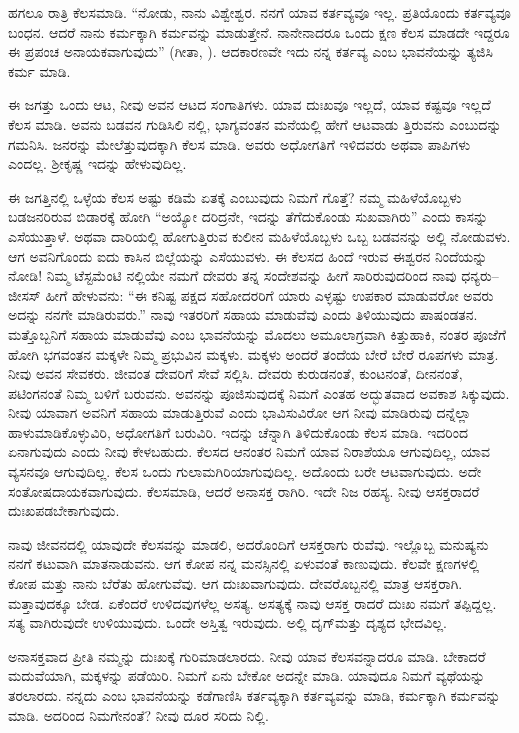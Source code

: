 ಹಗಲೂ ರಾತ್ರಿ ಕೆಲಸಮಾಡಿ. “ನೋಡು, ನಾನು ವಿಶ್ವೇಶ್ವರ. ನನಗೆ ಯಾವ ಕರ್ತವ್ಯವೂ ಇಲ್ಲ. ಪ್ರತಿಯೊಂದು ಕರ್ತವ್ಯವೂ ಬಂಧನ. ಆದರೆ ನಾನು ಕರ್ಮಕ್ಕಾಗಿ ಕರ್ಮವನ್ನು ಮಾಡುತ್ತೇನೆ. ನಾನೇನಾದರೂ ಒಂದು ಕ್ಷಣ ಕೆಲಸ ಮಾಡದೇ ಇದ್ದರೂ ಈ ಪ್ರಪಂಚ ಅನಾಯಕ\-ವಾಗುವುದು” (ಗೀತಾ, ). ಆದಕಾರಣವೇ ಇದು ನನ್ನ ಕರ್ತವ್ಯ ಎಂಬ ಭಾವನೆಯನ್ನು ತ್ಯಜಿಸಿ ಕರ್ಮ ಮಾಡಿ.

ಈ ಜಗತ್ತು ಒಂದು ಆಟ, ನೀವು ಅವನ ಆಟದ ಸಂಗಾತಿಗಳು. ಯಾವ ದುಃಖವೂ ಇಲ್ಲದೆ, ಯಾವ ಕಷ್ಟವೂ ಇಲ್ಲದೆ ಕೆಲಸ ಮಾಡಿ. ಅವನು ಬಡವನ ಗುಡಿಸಿಲಿ ನಲ್ಲಿ, ಭಾಗ್ಯವಂತನ ಮನೆಯಲ್ಲಿ ಹೇಗೆ ಆಟವಾಡು ತ್ತಿರುವನು ಎಂಬುದನ್ನು ಗಮನಿಸಿ. ಜನರನ್ನು ಮೇಲೆತ್ತುವುದಕ್ಕಾಗಿ ಕೆಲಸ ಮಾಡಿ. ಅವರು ಅಧೋಗತಿಗೆ ಇಳಿದವರು ಅಥವಾ ಪಾಪಿಗಳು ಎಂದಲ್ಲ. ಶ‍್ರೀಕೃಷ್ಣ ಇದನ್ನು ಹೇಳುವುದಿಲ್ಲ.

ಈ ಜಗತ್ತಿನಲ್ಲಿ ಒಳ್ಳೆಯ ಕೆಲಸ ಅಷ್ಟು ಕಡಿಮೆ ಏತಕ್ಕೆ ಎಂಬುವುದು ನಿಮಗೆ ಗೊತ್ತೆ? ನಮ್ಮ ಮಹಿಳೆಯೊಬ್ಬಳು ಬಡಜನರಿರುವ ಬಿಡಾರಕ್ಕೆ ಹೋಗಿ “ಅಯ್ಯೋ ದರಿದ್ರನೇ, ಇದನ್ನು ತೆಗೆದುಕೊಂಡು ಸುಖವಾಗಿರು” ಎಂದು ಕಾಸನ್ನು ಎಸೆಯುತ್ತಾಳೆ. ಅಥವಾ ದಾರಿಯಲ್ಲಿ ಹೋಗುತ್ತಿರುವ ಕುಲೀನ ಮಹಿಳೆಯೊಬ್ಬಳು ಒಬ್ಬ ಬಡವನನ್ನು ಅಲ್ಲಿ ನೋಡುವಳು. ಆಗ ಅವನಿಗೊಂದು ಐದು ಕಾಸಿನ ಬಿಲ್ಲೆಯನ್ನು ಎಸೆಯುವಳು. ಈ ಕೆಲಸದ ಹಿಂದೆ ಇರುವ ಈಶ್ವರನ ನಿಂದೆಯನ್ನು ನೋಡಿ! ನಿಮ್ಮ ಟೆಸ್ಟಮೆಂಟಿ ನಲ್ಲಿಯೇ ನಮಗೆ ದೇವರು ತನ್ನ ಸಂದೇಶವನ್ನು ಹೀಗೆ ಸಾರಿರುವುದರಿಂದ ನಾವು ಧನ್ಯರು– ಜೀಸಸ್​ ಹೀಗೆ ಹೇಳುವನು: “ಈ ಕನಿಷ್ಟ ಪಕ್ಷದ ಸಹೋದರರಿಗೆ ಯಾರು ಎಳ್ಳಷ್ಟು ಉಪಕಾರ ಮಾಡುವರೋ ಅವರು ಅದನ್ನು ನನಗೇ ಮಾಡಿರುವರು.” ನಾವು ಇತರರಿಗೆ ಸಹಾಯ ಮಾಡುವೆವು ಎಂದು ತಿಳಿಯುವುದು ಪಾಷಂಡತನ. ಮತ್ತೊಬ್ಬನಿಗೆ ಸಹಾಯ ಮಾಡುವೆವು ಎಂಬ ಭಾವನೆಯನ್ನು ಮೊದಲು ಅಮೂಲಾಗ್ರವಾಗಿ ಕಿತ್ತುಹಾಕಿ, ನಂತರ ಪೂಜೆಗೆ ಹೋಗಿ ಭಗವಂತನ ಮಕ್ಕಳೇ ನಿಮ್ಮ ಪ್ರಭುವಿನ ಮಕ್ಕಳು. ಮಕ್ಕಳು ಅಂದರೆ ತಂದೆಯ ಬೇರೆ ಬೇರೆ ರೂಪಗಳು ಮಾತ್ರ. ನೀವು ಅವನ ಸೇವಕರು. ಜೀವಂತ ದೇವರಿಗೆ ಸೇವೆ ಸಲ್ಲಿಸಿ. ದೇವರು ಕುರುಡನಂತೆ, ಕುಂಟನಂತೆ, ದೀನನಂತೆ, ಪಟಿಂಗನಂತೆ ನಿಮ್ಮ ಬಳಿಗೆ ಬರುವನು. ಅವನನ್ನು ಪೂಜಿಸುವುದಕ್ಕೆ ನಿಮಗೆ ಎಂತಹ ಅದ್ಭುತವಾದ ಅವಕಾಶ ಸಿಕ್ಕುವುದು. ನೀವು ಯಾವಾಗ ಅವನಿಗೆ ಸಹಾಯ ಮಾಡುತ್ತಿರುವೆ ಎಂದು ಭಾವಿಸುವಿರೋ ಆಗ ನೀವು ಮಾಡಿರುವು ದನ್ನೆಲ್ಲಾ ಹಾಳುಮಾಡಿಕೊಳ್ಳುವಿರಿ, ಅಧೋಗತಿಗೆ ಬರುವಿರಿ. ಇದನ್ನು ಚೆನ್ನಾಗಿ ತಿಳಿದುಕೊಂಡು ಕೆಲಸ ಮಾಡಿ. ಇದರಿಂದ ಏನಾಗುವುದು ಎಂದು ನೀವು ಕೇಳಬಹುದು. ಕೆಲಸದ ಆನಂತರ ನಿಮಗೆ ಯಾವ ನಿರಾಶೆಯೂ ಆಗುವುದಿಲ್ಲ, ಯಾವ ವ್ಯಸನವೂ ಆಗುವುದಿಲ್ಲ. ಕೆಲಸ ಒಂದು ಗುಲಾಮಗಿರಿಯಾಗುವುದಿಲ್ಲ. ಅದೊಂದು ಬರೇ ಆಟವಾಗುವುದು. ಅದೇ ಸಂತೋಷದಾಯಕವಾಗುವುದು. ಕೆಲಸಮಾಡಿ, ಆದರೆ ಅನಾಸಕ್ತ ರಾಗಿರಿ. ಇದೇ ನಿಜ ರಹಸ್ಯ. ನೀವು ಆಸಕ್ತರಾದರೆ ದುಃಖಪಡಬೇಕಾಗುವುದು.

ನಾವು ಜೀವನದಲ್ಲಿ ಯಾವುದೇ ಕೆಲಸವನ್ನು ಮಾಡಲಿ, ಅದರೊಂದಿಗೆ ಆಸಕ್ತರಾಗು ರುವೆವು. ಇಲ್ಲೊಬ್ಬ ಮನುಷ್ಯನು ನನಗೆ ಕಟುವಾಗಿ ಮಾತನಾಡುವನು. ಆಗ ಕೋಪ ನನ್ನ ಮನಸ್ಸಿನಲ್ಲಿ ಏಳುವಂತೆ ಕಾಣುವುದು. ಕೆಲವೇ ಕ್ಷಣಗಳಲ್ಲಿ ಕೋಪ ಮತ್ತು ನಾನು ಬೆರೆತು ಹೋಗುವೆವು. ಆಗ ದುಃಖವಾಗುವುದು. ದೇವರೊಬ್ಬನಲ್ಲಿ ಮಾತ್ರ ಆಸಕ್ತರಾಗಿ. ಮತ್ತಾವುದಕ್ಕೂ ಬೇಡ. ಏಕೆಂದರೆ ಉಳಿದವುಗಳೆಲ್ಲ ಅಸತ್ಯ. ಅಸತ್ಯಕ್ಕೆ ನಾವು ಆಸಕ್ತ ರಾದರೆ ದುಃಖ ನಮಗೆ ತಪ್ಪಿದ್ದಲ್ಲ. ಸತ್ಯ ವಾಗಿರುವುದೇ ಉಳಿಯುವುದು. ಒಂದೇ ಅಸ್ತಿತ್ವ ಇರುವುದು. ಅಲ್ಲಿ ದೃಗ್​ ಮತ್ತು ದೃಶ್ಯದ ಭೇದವಿಲ್ಲ.

ಅನಾಸಕ್ತವಾದ ಪ್ರೀತಿ ನಮ್ಮನ್ನು ದುಃಖಕ್ಕೆ ಗುರಿಮಾಡಲಾರದು. ನೀವು ಯಾವ ಕೆಲಸವನ್ನಾದರೂ ಮಾಡಿ. ಬೇಕಾದರೆ ಮದುವೆಯಾಗಿ, ಮಕ್ಕಳನ್ನು ಪಡೆಯಿರಿ. ನಿಮಗೆ ಏನು ಬೇಕೋ ಅದನ್ನೇ ಮಾಡಿ. ಯಾವುದೂ ನಿಮಗೆ ವ್ಯಥೆಯನ್ನು ತರಲಾರದು. ನನ್ನದು ಎಂಬ ಭಾವನೆಯನ್ನು ಕಡೆಗಾಣಿಸಿ ಕರ್ತವ್ಯಕ್ಕಾಗಿ ಕರ್ತವ್ಯವನ್ನು ಮಾಡಿ, ಕರ್ಮಕ್ಕಾಗಿ ಕರ್ಮವನ್ನು ಮಾಡಿ. ಅದರಿಂದ ನಿಮಗೇನಂತೆ? ನೀವು ದೂರ ಸರಿದು ನಿಲ್ಲಿ.

